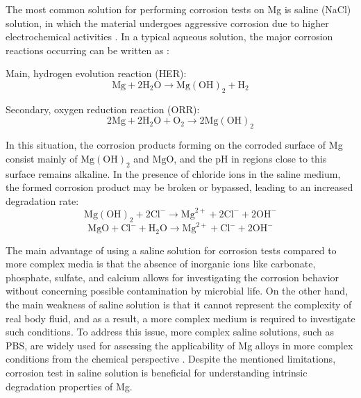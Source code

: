 The most common solution for performing corrosion tests on Mg is saline (NaCl) solution, in which the material undergoes aggressive corrosion due to higher electrochemical activities \cite{Hadzima2014,Lu2019}. In a typical aqueous solution, the major corrosion reactions occurring can be written as \cite{Li2020,Atrens2015}:


Main, hydrogen evolution reaction (\gls{HER}):
\begin{equation}
\mathrm{Mg}+2 \mathrm{H}_{2} \mathrm{O} \rightarrow \mathrm{Mg}(\mathrm{OH})_{2}+\mathrm{H}_{2} 
\end{equation}

Secondary, oxygen reduction reaction (\gls{ORR}):
\begin{equation}
2 \mathrm{Mg}+2 \mathrm{H}_{2} \mathrm{O}+\mathrm{O}_{2} \rightarrow 2 \mathrm{Mg}(\mathrm{OH})_{2}
\end{equation}

In this situation, the corrosion products forming on the corroded surface of Mg consist mainly of $\mathrm{Mg}(\mathrm{OH})_{2}$ and $\mathrm{MgO}$, and the pH in regions close to this surface remains alkaline. In the presence of chloride ions in the saline medium, the formed corrosion product may be broken or bypassed, leading to an increased degradation rate:
\begin{equation} \label{eq:break_react_intro}
\mathrm{Mg}(\mathrm{OH})_{2}+2 \mathrm{Cl}^{-} \rightarrow \mathrm{Mg}^{2+}+2 \mathrm{Cl}^{-}+2 \mathrm{OH}^{-}
\end{equation}
\begin{equation} \label{eq:break_react_mgo_intro}
\mathrm{MgO}+ \mathrm{Cl}^{-} + \mathrm{H}_{2} \mathrm{O} \rightarrow \mathrm{Mg}^{2+}+ \mathrm{Cl}^{-}+ 2\mathrm{OH}^{-}
\end{equation}


The main advantage of using a saline solution for corrosion tests compared to more complex media is that the absence of inorganic ions like carbonate, phosphate, sulfate, and calcium allows for investigating the corrosion behavior without concerning possible contamination by microbial life. On the other hand, the main weakness of saline solution is that it cannot represent the complexity of real body fluid, and as a result, a more complex medium is required to investigate such conditions. To address this issue, more complex saline solutions, such as PBS, are widely used for assessing the applicability of Mg alloys in more complex conditions from the chemical perspective \cite{Schille2011,Xue2012}. Despite the mentioned limitations, corrosion test in saline solution is beneficial for understanding intrinsic degradation properties of Mg. 



